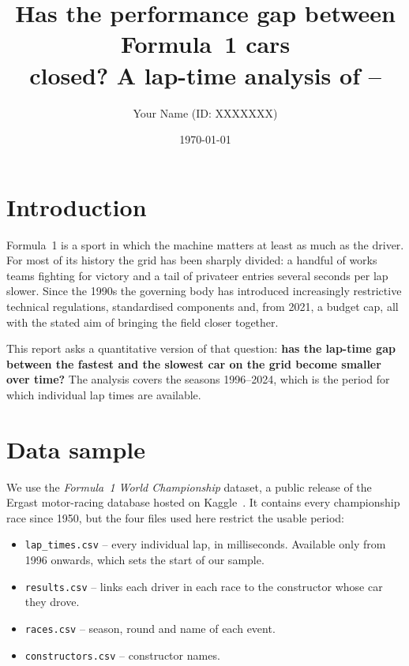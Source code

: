 \documentclass[11pt,a4paper]{article}
\title{\vspace{-1.5cm}\bfseries Has the performance gap between Formula~1 cars\\
       closed? A lap-time analysis of \firstYear--\lastYear}
\author{Your Name (ID: XXXXXXX)}
\date{\today}
\newcommand{\firstYear}{1996}
\newcommand{\lastYear}{2024}
\begin{document}
\maketitle
\vspace{-0.8cm}

\section{Introduction}
Formula~1 is a sport in which the machine matters at least as much as the
driver. For most of its history the grid has been sharply divided: a handful of
works teams fighting for victory and a tail of privateer entries several seconds
per lap slower. Since the 1990s the governing body has introduced increasingly
restrictive technical regulations, standardised components and, from 2021, a
budget cap, all with the stated aim of bringing the field closer together.

This report asks a quantitative version of that question: \textbf{has the lap-time
gap between the fastest and the slowest car on the grid become smaller over
time?} The analysis covers the seasons \firstYear--\lastYear, which is the period
for which individual lap times are available.

\section{Data sample}
We use the \emph{Formula~1 World Championship} dataset, a public release of the
Ergast motor-racing database hosted on Kaggle~\cite{dataset}. It contains every
championship race since 1950, but the four files used here restrict the usable
period:

\begin{itemize}\itemsep1pt
  \item \texttt{lap\_times.csv} -- every individual lap, in milliseconds.
        Available only from 1996 onwards, which sets the start of our sample.
  \item \texttt{results.csv} -- links each driver in each race to the constructor
        whose car they drove.
  \item \texttt{races.csv} -- season, round and name of each event.
  \item \texttt{constructors.csv} -- constructor names.
\end{itemize}
\end{document}
